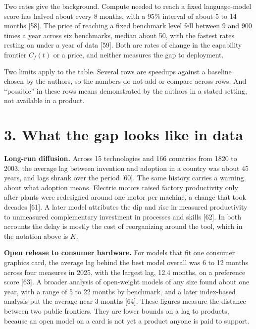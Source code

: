 \documentclass[10pt,letterpaper]{article}
\begin{document}
Two rates give the background. Compute needed to reach a fixed
language-model score has halved about every 8 months, with a 95\%
interval of about 5 to 14 months {[}58{]}. The price of reaching a fixed
benchmark level fell between 9 and 900 times a year across six
benchmarks, median about 50, with the fastest rates resting on under a
year of data {[}59{]}. Both are rates of change in the capability
frontier \(C_f(t)\) or a price, and neither measures the gap to
deployment.

Two limits apply to the table. Several rows are speedups against a
baseline chosen by the authors, so the numbers do not add or compare
across rows. And ``possible'' in these rows means demonstrated by the
authors in a stated setting, not available in a product.

\section{3. What the gap looks like in
data}\label{what-the-gap-looks-like-in-data}

\textbf{Long-run diffusion.} Across 15 technologies and 166 countries
from 1820 to 2003, the average lag between invention and adoption in a
country was about 45 years, and lags shrank over the period {[}60{]}.
The same history carries a warning about what adoption means. Electric
motors raised factory productivity only after plants were redesigned
around one motor per machine, a change that took decades {[}61{]}. A
later model attributes the dip and rise in measured productivity to
unmeasured complementary investment in processes and skills {[}62{]}. In
both accounts the delay is mostly the cost of reorganizing around the
tool, which in the notation above is \(K\).

\textbf{Open release to consumer hardware.} For models that fit one
consumer graphics card, the average lag behind the best model overall
was 6 to 12 months across four measures in 2025, with the largest lag,
12.4 months, on a preference score {[}63{]}. A broader analysis of
open-weight models of any size found about one year, with a range of 5
to 22 months by benchmark, and a later index-based analysis put the
average near 3 months {[}64{]}. These figures measure the distance
between two public frontiers. They are lower bounds on a lag to
products, because an open model on a card is not yet a product anyone is
paid to support.
\end{document}
